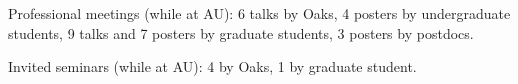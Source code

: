 \begin{veryTightItemize}
    \item Professional meetings (while at AU): 6 talks by Oaks,
        4 posters by undergraduate students,
        9 talks and 7 posters by graduate students,
        3 posters by postdocs.
    \item Invited seminars (while at AU): 4 by Oaks, 1 by graduate student.
\end{veryTightItemize}
